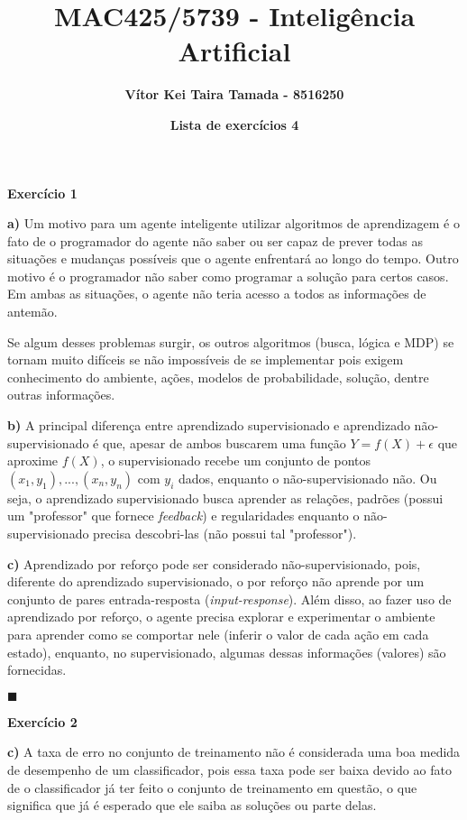 \documentclass{article}
\title{\textbf{MAC425/5739 - Inteligência Artificial}}
\author{\textbf{Vítor Kei Taira Tamada - 8516250}}
\date{\textbf{Lista de exercícios 4}}
\begin{document}
\maketitle

\textbf{\Large{Exercício 1}}

\quad \textbf{a)} Um motivo para um agente inteligente utilizar algoritmos de aprendizagem é o fato de o programador do agente não saber ou ser capaz de prever todas as situações e mudanças possíveis que o agente enfrentará ao longo do tempo. Outro motivo é o programador não saber como programar a solução para certos casos. Em ambas as situações, o agente não teria acesso a todos as informações de antemão.

Se algum desses problemas surgir, os outros algoritmos (busca, lógica e MDP) se tornam muito difíceis se não impossíveis de se implementar pois exigem conhecimento do ambiente, ações, modelos de probabilidade, solução, dentre outras informações.

\bigskip
\quad \textbf{b)} A principal diferença entre aprendizado supervisionado e aprendizado não-supervisionado é que, apesar de ambos buscarem uma função $Y = f(X) + \epsilon$ que aproxime $f(X)$, o supervisionado recebe um conjunto de pontos $(x_{1}, y_{1}), ..., (x_{n}, y_{n})$ com $y_{i}$ dados, enquanto o não-supervisionado não. Ou seja, o aprendizado supervisionado busca aprender as relações, padrões (possui um "professor" que fornece \textit{feedback}) e regularidades enquanto o não-supervisionado precisa descobri-las (não possui tal "professor").

\bigskip
\quad \textbf{c)} Aprendizado por reforço pode ser considerado não-supervisionado, pois, diferente do aprendizado supervisionado, o por reforço não aprende por um conjunto de pares entrada-resposta (\textit{input-response}). Além disso, ao fazer uso de aprendizado por reforço, o agente precisa explorar e experimentar o ambiente para aprender como se comportar nele (inferir o valor de cada ação em cada estado), enquanto, no supervisionado, algumas dessas informações (valores) são fornecidas.

\begin{flushright}
$\blacksquare$
\end{flushright}

\textbf{\Large{Exercício 2}}

\bigskip
\quad \textbf{c)} A taxa de erro no conjunto de treinamento não é considerada uma boa medida de desempenho de um classificador, pois essa taxa pode ser baixa devido ao fato de o classificador já ter feito o conjunto de treinamento em questão, o que significa que já é esperado que ele saiba as soluções ou parte delas.
\end{document}
